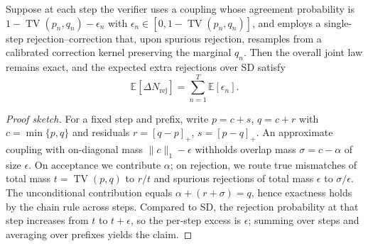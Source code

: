 \begin{proposition}\label{prop:tv-rejection-sum}\sloppy
Suppose at each step the verifier uses a coupling whose agreement probability is $1-\operatorname{TV}(p_n,q_n)-\epsilon_n$ with $\epsilon_n\in[0,1-\operatorname{TV}(p_n,q_n)]$, and employs a single-step rejection--correction that, upon spurious rejection, resamples from a calibrated correction kernel preserving the marginal $q_n$. Then the overall joint law remains exact, and the expected extra rejections over SD satisfy
\[
\mathbb E[\Delta N_{\mathrm{rej}}]=\sum_{n=1}^T\mathbb E[\epsilon_n].
\]
\end{proposition}

\begin{proof}[Proof sketch]
For a fixed step and prefix, write $p=c+s$, $q=c+r$ with $c=\min\{p,q\}$ and residuals $r=[q-p]_+$, $s=[p-q]_+$. An approximate coupling with on-diagonal mass $\|c\|_1-\epsilon$ withholds overlap mass $\sigma=c-\alpha$ of size $\epsilon$. On acceptance we contribute $\alpha$; on rejection, we route true mismatches of total mass $t=\operatorname{TV}(p,q)$ to $r/t$ and spurious rejections of total mass $\epsilon$ to $\sigma/\epsilon$. The unconditional contribution equals $\alpha+(r+\sigma)=q$, hence exactness holds by the chain rule across steps. Compared to SD, the rejection probability at that step increases from $t$ to $t+\epsilon$, so the per-step excess is $\epsilon$; summing over steps and averaging over prefixes yields the claim.\qedhere
\end{proof}

